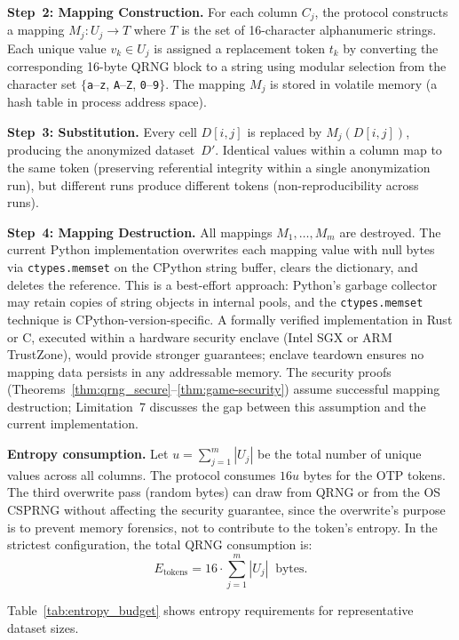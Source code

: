 \documentclass[journal]{IEEEtran}
\begin{document}
\textbf{Step~2: Mapping Construction.} For each column $C_j$, the protocol constructs a mapping $M_j\colon U_j \to T$ where $T$ is the set of 16-character alphanumeric strings. Each unique value $v_k \in U_j$ is assigned a replacement token $t_k$ by converting the corresponding 16-byte QRNG block to a string using modular selection from the character set $\{$\texttt{a}--\texttt{z}, \texttt{A}--\texttt{Z}, \texttt{0}--\texttt{9}$\}$. The mapping $M_j$ is stored in volatile memory (a hash table in process address space).

\textbf{Step~3: Substitution.} Every cell $D[i,j]$ is replaced by $M_j(D[i,j])$, producing the anonymized dataset~$D'$. Identical values within a column map to the same token (preserving referential integrity within a single anonymization run), but different runs produce different tokens (non-reproducibility across runs).

\textbf{Step~4: Mapping Destruction.} All mappings $M_1, \ldots, M_m$ are destroyed. The current Python implementation overwrites each mapping value with null bytes via \texttt{ctypes.memset} on the CPython string buffer, clears the dictionary, and deletes the reference. This is a best-effort approach: Python's garbage collector may retain copies of string objects in internal pools, and the \texttt{ctypes.memset} technique is CPython-version-specific. A formally verified implementation in Rust or C, executed within a hardware security enclave (Intel SGX or ARM TrustZone), would provide stronger guarantees; enclave teardown ensures no mapping data persists in any addressable memory. The security proofs (Theorems~\ref{thm:qrng_secure}--\ref{thm:game-security}) assume successful mapping destruction; Limitation~7 discusses the gap between this assumption and the current implementation.

\textbf{Entropy consumption.} Let $u = \sum_{j=1}^{m} |U_j|$ be the total number of unique values across all columns. The protocol consumes $16u$ bytes for the OTP tokens. The third overwrite pass (random bytes) can draw from QRNG or from the OS CSPRNG without affecting the security guarantee, since the overwrite's purpose is to prevent memory forensics, not to contribute to the token's entropy. In the strictest configuration, the total QRNG consumption is:
\begin{equation}
E_{\mathrm{tokens}} = 16 \cdot \sum_{j=1}^{m} |U_j| \;\;\text{bytes}.
\label{eq:entropy_consumption}
\end{equation}

Table~\ref{tab:entropy_budget} shows entropy requirements for representative dataset sizes.
\end{document}
